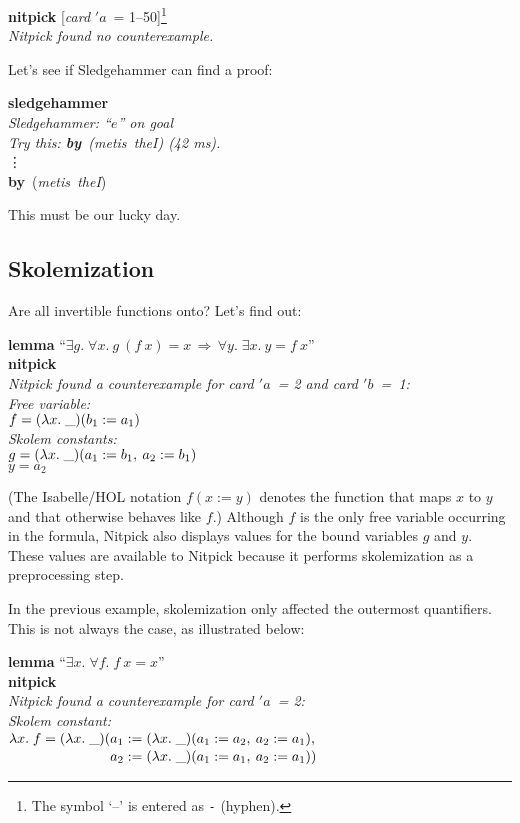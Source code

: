 \documentclass[a4paper,12pt]{article}
\def\undef{(\lambda x.\; \_)}
\renewcommand\_{\hbox{\textunderscore\kern-.05ex}}
\begin{document}
\prew
\textbf{nitpick} [\textit{card} $'a$~= 1--50]\footnote{The symbol `--'
is entered as \texttt{-} (hyphen).} \\[2\smallskipamount]
\slshape Nitpick found no counterexample.
\postw

Let's see if Sledgehammer can find a proof:

\prew
\textbf{sledgehammer} \\[2\smallskipamount]
{\slshape Sledgehammer: ``$e$'' on goal \\
Try this: \textbf{by}~(\textit{metis~theI}) (42 ms).} \\
\hbox{}\qquad\vdots \\[2\smallskipamount]
\textbf{by}~(\textit{metis~theI\/})
\postw

This must be our lucky day.

\subsection{Skolemization}
\label{skolemization}

Are all invertible functions onto? Let's find out:

\prew
\textbf{lemma} ``$\exists g.\; \forall x.~g~(f~x) = x
 \,\Longrightarrow\, \forall y.\; \exists x.~y = f~x$'' \\
\textbf{nitpick} \\[2\smallskipamount]
\slshape
Nitpick found a counterexample for \textit{card} $'a$~= 2 and \textit{card} $'b$~=~1: \\[2\smallskipamount]
\hbox{}\qquad Free variable: \nopagebreak \\
\hbox{}\qquad\qquad $f = \undef{}(b_1 := a_1)$ \\
\hbox{}\qquad Skolem constants: \nopagebreak \\
\hbox{}\qquad\qquad $g = \undef{}(a_1 := b_1,\> a_2 := b_1)$ \\
\hbox{}\qquad\qquad $y = a_2$
\postw

(The Isabelle/HOL notation $f(x := y)$ denotes the function that maps $x$ to $y$
and that otherwise behaves like $f$.)
Although $f$ is the only free variable occurring in the formula, Nitpick also
displays values for the bound variables $g$ and $y$. These values are available
to Nitpick because it performs skolemization as a preprocessing step.

In the previous example, skolemization only affected the outermost quantifiers.
This is not always the case, as illustrated below:

\prew
\textbf{lemma} ``$\exists x.\; \forall f.\; f~x = x$'' \\
\textbf{nitpick} \\[2\smallskipamount]
\slshape
Nitpick found a counterexample for \textit{card} $'a$~= 2: \\[2\smallskipamount]
\hbox{}\qquad Skolem constant: \nopagebreak \\
\hbox{}\qquad\qquad $\lambda x.\; f =
    \undef{}(\!\begin{aligned}[t]
    & a_1 := \undef{}(a_1 := a_2,\> a_2 := a_1), \\[-2pt]
    & a_2 := \undef{}(a_1 := a_1,\> a_2 := a_1))\end{aligned}$
\postw
\end{document}
